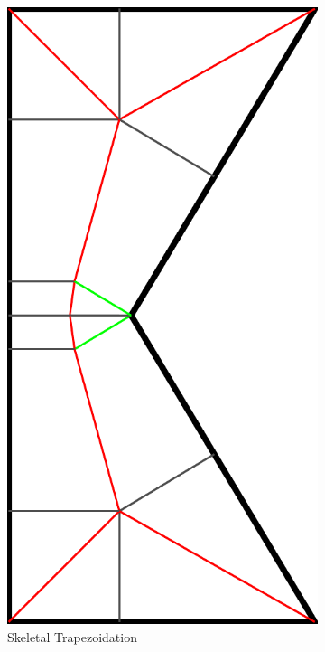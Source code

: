 \begin{figure}
\begin{subfigure}[t]{\figwidth}
\includegraphics[height=\figwidthTwo]{sources-method-simple-skeleton-st}
\caption{Skeletal Trapezoidation}\label{shape_decomposition_st}
\end{subfigure}
\begin{subfigure}[t]{\figwidth}\centering

\end{subfigure}
\end{figure}
